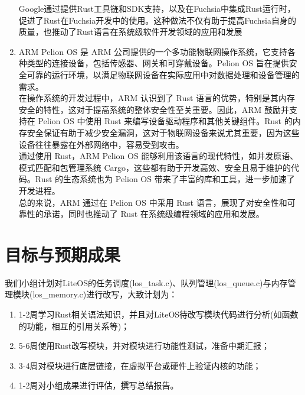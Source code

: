 \documentclass{ctexart}
\begin{document}
\begin{enumerate}
Google通过提供Rust工具链和SDK支持，以及在Fuchsia中集成Rust运行时，促进了Rust在Fuchsia开发中的使用。这种做法不仅有助于提高Fuchsia自身的质量，也推动了Rust语言在系统级软件开发领域的应用和发展
\item ARM Pelion OS 是 ARM 公司提供的一个多功能物联网操作系统，它支持各种类型的连接设备，包括传感器、网关和可穿戴设备。Pelion OS 旨在提供安全可靠的运行环境，以满足物联网设备在实际应用中对数据处理和设备管理的需求。\\
在操作系统的开发过程中，ARM 认识到了 Rust 语言的优势，特别是其内存安全的特性，这对于提高系统的整体安全性至关重要。因此，ARM 鼓励并支持在 Pelion OS 中使用 Rust 来编写设备驱动程序和其他关键组件。Rust 的内存安全保证有助于减少安全漏洞，这对于物联网设备来说尤其重要，因为这些设备往往暴露在外部网络中，容易受到攻击。\\
通过使用 Rust，ARM Pelion OS 能够利用该语言的现代特性，如并发原语、模式匹配和包管理系统 Cargo，这些都有助于开发高效、安全且易于维护的代码。Rust 的生态系统也为 Pelion OS 带来了丰富的库和工具，进一步加速了开发进程。\\
总的来说，ARM 通过在 Pelion OS 中采用 Rust 语言，展现了对安全性和可靠性的承诺，同时也推动了 Rust 在系统级编程领域的应用和发展。
\end{enumerate}
\section{目标与预期成果}
我们小组计划对LiteOS的任务调度(los_task.c)、队列管理(los_queue.c)与内存管理模块(los_memory.c)进行改写，大致计划为：
\begin{enumerate}
\item 1-2周学习Rust相关语法知识，并且对LiteOS待改写模块代码进行分析(如函数的功能，相互的引用关系等)；
\item 5-6周使用Rust改写模块，并对模块进行功能性测试，准备中期汇报；
\item 3-4周对模块进行底层链接，在虚拟平台或硬件上验证内核的功能；
\item 1-2周对小组成果进行评估，撰写总结报告。
\end{enumerate}
\end{document}
